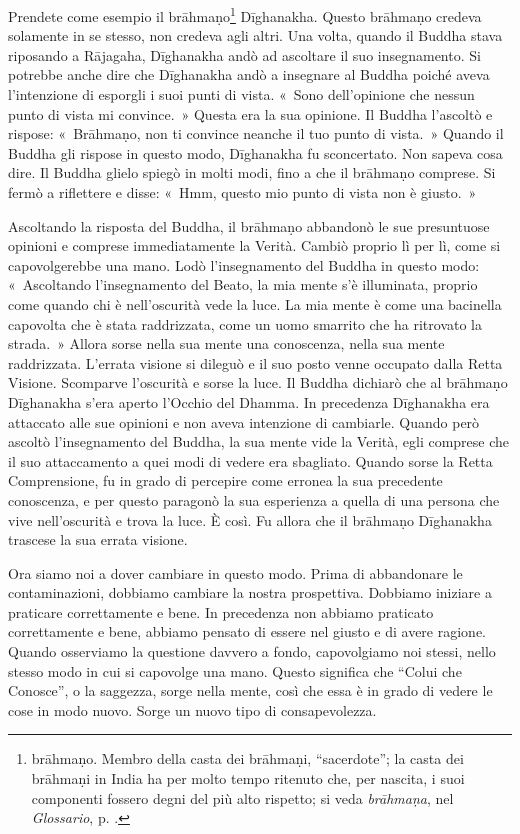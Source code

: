 Prendete come esempio il brāhmaṇo\footnote{brāhmaṇo. Membro della casta
  dei brāhmaṇi, ``sacerdote''; la casta dei brāhmaṇi in India ha per
  molto tempo ritenuto che, per nascita, i suoi componenti fossero degni
  del più alto rispetto; si veda \emph{brāhmaṇa}, nel \emph{Glossario}, p. \pageref{glossary-brahmana}.}
Dīghanakha. Questo brāhmaṇo credeva solamente in se stesso, non credeva
agli altri. Una volta, quando il Buddha stava riposando a Rājagaha,
Dīghanakha andò ad ascoltare il suo insegnamento. Si potrebbe anche dire
che Dīghanakha andò a insegnare al Buddha poiché aveva l'intenzione di
esporgli i suoi punti di vista. «~Sono dell'opinione che nessun punto di
vista mi convince.~» Questa era la sua opinione. Il Buddha l'ascoltò e
rispose: «~Brāhmaṇo, non ti convince neanche il tuo punto di vista.~»
Quando il Buddha gli rispose in questo modo, Dīghanakha fu sconcertato.
Non sapeva cosa dire. Il Buddha glielo spiegò in molti modi, fino a che
il brāhmaṇo comprese. Si fermò a riflettere e disse: «~Hmm, questo mio
punto di vista non è giusto.~»

Ascoltando la risposta del Buddha, il brāhmaṇo abbandonò le sue
presuntuose opinioni e comprese immediatamente la Verità. Cambiò proprio
lì per lì, come si capovolgerebbe una mano. Lodò l'insegnamento del
Buddha in questo modo: «~Ascoltando l'insegnamento del Beato, la mia
mente s'è illuminata, proprio come quando chi è nell'oscurità vede la
luce. La mia mente è come una bacinella capovolta che è stata
raddrizzata, come un uomo smarrito che ha ritrovato la strada.~» Allora
sorse nella sua mente una conoscenza, nella sua mente raddrizzata.
L'errata visione si dileguò e il suo posto venne occupato dalla Retta
Visione. Scomparve l'oscurità e sorse la luce. Il Buddha dichiarò che al
brāhmaṇo Dīghanakha s'era aperto l'Occhio del Dhamma. In precedenza
Dīghanakha era attaccato alle sue opinioni e non aveva intenzione di
cambiarle. Quando però ascoltò l'insegnamento del Buddha, la sua mente
vide la Verità, egli comprese che il suo attaccamento a quei modi di
vedere era sbagliato. Quando sorse la Retta Comprensione, fu in grado di
percepire come erronea la sua precedente conoscenza, e per questo
paragonò la sua esperienza a quella di una persona che vive
nell'oscurità e trova la luce. È così. Fu allora che il brāhmaṇo
Dīghanakha trascese la sua errata visione.

Ora siamo noi a dover cambiare in questo modo. Prima di abbandonare le
contaminazioni, dobbiamo cambiare la nostra prospettiva. Dobbiamo
iniziare a praticare correttamente e bene. In precedenza non abbiamo
praticato correttamente e bene, abbiamo pensato di essere nel giusto e
di avere ragione. Quando osserviamo la questione davvero a fondo,
capovolgiamo noi stessi, nello stesso modo in cui si capovolge una mano.
Questo significa che ``Colui che Conosce'', o la saggezza, sorge nella
mente, così che essa è in grado di vedere le cose in modo nuovo. Sorge
un nuovo tipo di consapevolezza.

